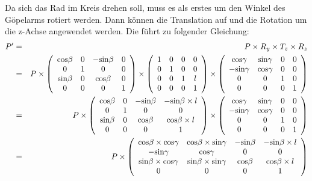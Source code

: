 \documentclass[a4paper,12pt]{article}
\begin{document}
Da sich das Rad im Kreis drehen soll, muss es als erstes um den Winkel des
Göpelarms rotiert werden. Dann können die Translation auf und die Rotation um
die z-Achse angewendet werden. Die führt zu folgender Gleichung:
\begin{eqnarray}
P' & = & P \times R_{y} \times T_{z} \times R_{z} \nonumber \\
& = & P \times \left(\begin{array}{ c c c c }
\mbox{cos} \beta & 0 & - \mbox{sin} \beta & 0 \\
0 & 1 & 0 & 0 \\
\mbox{sin} \beta & 0 & \mbox{cos} \beta & 0 \\
0 & 0 & 0 & 1
\end{array} \right) \times \left(\begin{array}{ c c c c }
1 & 0 & 0 & 0 \\
0 & 1 & 0 & 0 \\
0 & 0 & 1 & l \\
0 & 0 & 0 & 1
\end{array} \right) \times \left(\begin{array}{ c c c c }
\mbox{cos} \gamma & \mbox{sin} \gamma & 0 & 0 \\
- \mbox{sin} \gamma & \mbox{cos} \gamma & 0 & 0 \\
0 & 0 & 1 & 0 \\
0 & 0 & 0 & 1
\end{array} \right) \nonumber \\
& = & P \times \left(\begin{array}{ c c c c }
\mbox{cos} \beta & 0 & - \mbox{sin} \beta & - \mbox{sin} \beta \times l \\
0 & 1 & 0 & 0 \\
\mbox{sin} \beta & 0 & \mbox{cos} \beta & \mbox{cos} \beta \times l \\
0 & 0 & 0 & 1
\end{array} \right) \times \left(\begin{array}{ c c c c }
\mbox{cos} \gamma & \mbox{sin} \gamma & 0 & 0 \\
- \mbox{sin} \gamma & \mbox{cos} \gamma & 0 & 0 \\
0 & 0 & 1 & 0 \\
0 & 0 & 0 & 1
\end{array} \right) \nonumber \\
& = & P \times \left(\begin{array}{ c c c c }
\mbox{cos} \beta \times \mbox{cos} \gamma &
\mbox{cos} \beta \times \mbox{sin} \gamma &
- \mbox{sin} \beta & - \mbox{sin} \beta \times l \\
- \mbox{sin} \gamma & \mbox{cos} \gamma & 0 & 0 \\
\mbox{sin} \beta \times \mbox{cos} \gamma &
\mbox{sin} \beta \times \mbox{sin} \gamma &
\mbox{cos} \beta & \mbox{cos} \beta \times l \\
0 & 0 & 0 & 1
\end{array} \right)
\end{eqnarray}
\end{document}
